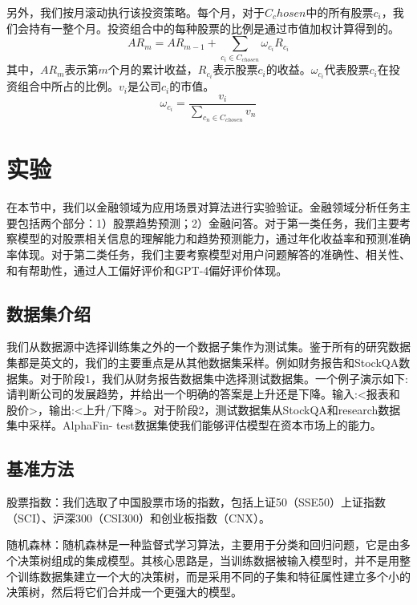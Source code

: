 另外，我们按月滚动执行该投资策略。每个月，对于$C_chosen$中的所有股票$c_i$，我们会持有一整个月。投资组合中的每种股票的比例是通过市值加权计算得到的。
\begin{equation}
	AR_m = AR_{m-1} + \sum_{c_i \in C_{chosen}}\omega_{c_i} R_{c_i}
\end{equation}
其中，$AR_m$表示第$m$个月的累计收益，$R_{c_i}$表示股票$c_i$的收益。$\omega_{c_i}$代表股票$c_i$在投资组合中所占的比例。$v_i$是公司$c_i$的市值。
\begin{equation}
	\omega_{c_i} = \frac{v_i}{\sum_{c_n \in C_{chosen}}v_n}
\end{equation}

\section{实验}

在本节中，我们以金融领域为应用场景对算法进行实验验证。金融领域分析任务主要包括两个部分：1）股票趋势预测；2）金融问答。对于第一类任务，我们主要考察模型的对股票相关信息的理解能力和趋势预测能力，通过年化收益率和预测准确率体现。对于第二类任务，我们主要考察模型对用户问题解答的准确性、相关性、和有帮助性，通过人工偏好评价和GPT-4偏好评价体现。

\subsection{数据集介绍}

我们从数据源中选择训练集之外的一个数据子集作为测试集。鉴于所有的研究数据集都是英文的，我们的主要重点是从其他数据集采样。例如财务报告和StockQA数据集。对于阶段1，我们从财务报告数据集中选择测试数据集。一个例子演示如下:请判断公司的发展趋势，并给出一个明确的答案是上升还是下降。输入:<报表和股价>，输出:<上升/下降>。对于阶段2，测试数据集从StockQA和research数据集中采样。AlphaFin- test数据集使我们能够评估模型在资本市场上的能力。

\subsection{基准方法}

股票指数：我们选取了中国股票市场的指数，包括上证50（SSE50）上证指数（SCI）、沪深300（CSI300）和创业板指数（CNX）。

随机森林：随机森林是一种监督式学习算法，主要用于分类和回归问题，它是由多个决策树组成的集成模型。其核心思路是，当训练数据被输入模型时，并不是用整个训练数据集建立一个大的决策树，而是采用不同的子集和特征属性建立多个小的决策树，然后将它们合并成一个更强大的模型。


